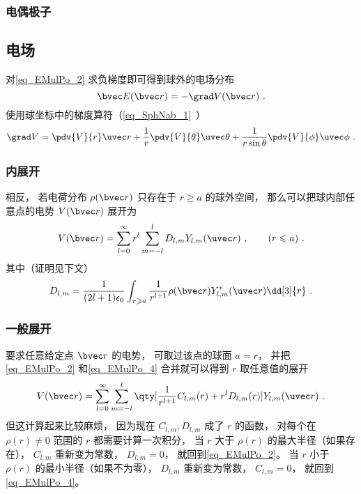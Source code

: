 \subsubsection{电偶极子}


\subsection{电场}
对\autoref{eq_EMulPo_2} 求负梯度即可得到球外的电场分布
\begin{equation}
\bvec E(\bvec r) = -\grad V(\bvec r)~.
\end{equation}
使用球坐标中的梯度算符（\autoref{eq_SphNab_1}~）
\begin{equation}
\grad V = \pdv{V}{r}\uvec r + \frac{1}{r} \pdv{V}{\theta}\uvec \theta  + \frac{1}{r\sin \theta }\pdv{V}{\phi}\uvec \phi~.
\end{equation}

\subsubsection{内展开}
相反， 若电荷分布 $\rho(\bvec r)$ 只存在于 $r \geqslant a$ 的球外空间， 那么可以把球内部任意点的电势 $V(\bvec r)$ 展开为
\begin{equation}\label{eq_EMulPo_4}
V(\bvec r) = \sum_{l = 0}^\infty r^l \sum_{m = -l}^l D_{l,m} Y_{l,m}(\uvec r)~, \qquad (r \leqslant a)~.
\end{equation}
其中（证明见下文）
\begin{equation}\label{eq_EMulPo_3}
D_{l,m} = \frac{1}{(2l+1)\epsilon_0} \int_{r\geqslant a} \frac{1}{r^{l+1}} \rho(\bvec r) Y_{l,m}^*(\uvec r) \dd[3]{r}~.
\end{equation}

\subsubsection{一般展开}
要求任意给定点 $\bvec r$ 的电势， 可取过该点的球面 $a = r$， 并把\autoref{eq_EMulPo_2} 和\autoref{eq_EMulPo_4} 合并就可以得到 $r$ 取任意值的展开
\begin{equation}
V(\bvec r) = \sum_{l = 0}^\infty\sum_{m = -l}^l \qty[\frac{1}{r^{l+1}} C_{l,m}(r) + r^l D_{l,m}(r)] Y_{l,m}(\uvec r)~.
\end{equation}
但这计算起来比较麻烦， 因为现在 $C_{l,m}, D_{l,m}$ 成了 $r$ 的函数， 对每个在 $\rho(r)\ne 0$ 范围的 $r$ 都需要计算一次积分， 当 $r$ 大于 $\rho(r)$ 的最大半径（如果存在）， $C_{l,m}$ 重新变为常数， $D_{l,m}= 0$， 就回到\autoref{eq_EMulPo_2}。 当 $r$ 小于 $\rho(r)$ 的最小半径（如果不为零）， $D_{l,m}$ 重新变为常数， $C_{l,m} = 0$， 就回到\autoref{eq_EMulPo_4}。

